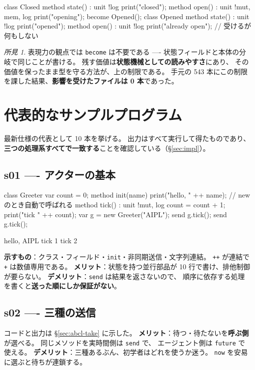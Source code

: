 \documentclass[11pt,a4paper]{ltjsarticle}
\theoremstyle{definition}
\theoremstyle{remark}
\newtheorem{finding}[theorem]{所見}
\begin{document}
\begin{aipl}
class Closed {
  method state() : unit !{log} { print("closed"); }
  method open()  : unit !{mut, mem, log} { print("opening"); become Opened(); }
}
class Opened {
  method state() : unit !{log} { print("opened"); }
  method open()  : unit !{log} { print("already open"); }   // 受けるが何もしない
}
\end{aipl}

\begin{finding}
表現力の観点では \texttt{become} は不要である ----
状態フィールドと本体の分岐で同じことが書ける。
残す価値は\textbf{状態機械としての読みやすさ}にあり、
その価値を保ったまま型を守る方法が、上の制限である。
手元の 543 本にこの制限を課した結果、\textbf{影響を受けたファイルは 0 本}であった。
\end{finding}

\section{代表的なサンプルプログラム}
\label{sec:samples}

最新仕様の代表として 10 本を挙げる。
出力はすべて実行して得たものであり、
\textbf{三つの処理系すべてで一致する}ことを確認している（\S\ref{sec:impl}）。

\subsection{s01 ---- アクターの基本}
\begin{aipl}
class Greeter {
  var count = 0;
  method init(name) { print("hello, " ++ name); }   // new のとき自動で呼ばれる
  method tick() : unit !{mut, log} {
    count = count + 1;
    print("tick " ++ count);
  }
}
var g = new Greeter("AIPL");
send g.tick();
send g.tick();
\end{aipl}
\begin{term}
hello, AIPL
tick 1
tick 2
\end{term}
\textbf{示すもの}：クラス・フィールド・\texttt{init}・非同期送信・文字列連結。
\texttt{++} が連結で \texttt{+} は数値専用である。
\textbf{メリット}：状態を持つ並行部品が 10 行で書け、排他制御が要らない。
\textbf{デメリット}：\texttt{send} は結果を返さないので、
順序に依存する処理を書くと\textbf{送った順にしか保証がない}。

\subsection{s02 ---- 三種の送信}
コードと出力は \S\ref{sec:abcl-take} に示した。
\textbf{メリット}：待つ・待たないを\textbf{呼ぶ側}が選べる。
同じメソッドを実時間側は \texttt{send} で、
エージェント側は \texttt{future} で使える。
\textbf{デメリット}：三種あるぶん、初学者はどれを使うか迷う。
\texttt{now} を安易に選ぶと待ちが連鎖する。
\end{document}
